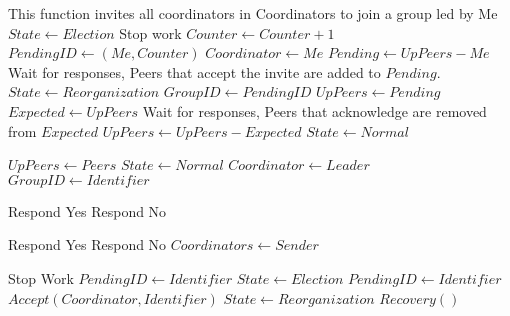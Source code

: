 \begin{flushleft}
\begin{algorithmic}[H]
    \State This function invites all coordinators in Coordinators to join a group led by Me
    \State $State \gets Election$
    \State Stop work
    \State $Counter \gets Counter+1$
    \State $PendingID \gets (Me,Counter)$
    \State $Coordinator \gets Me$
    \State $Pending \gets UpPeers - {Me}$
    \EndFor
    \State Wait for responses, Peers that accept the invite are added to $Pending$.
    \State $State \gets Reorganization$
	\State $GroupID \gets PendingID$
	\State $UpPeers \gets Pending$
    \EndFor
    \State $Expected \gets UpPeers$
    \State Wait for responses, Peers that acknowledge are removed from $Expected$
    \State $UpPeers \gets UpPeers - Expected$
    \State $State \gets Normal$
\EndFunction

\State

        \State $UpPeers \gets Peers$
        \State $State \gets Normal$
		\State $Coordinator \gets Leader$
		\State $GroupID \gets Identifier$
    \EndIf
\EndFunction

\State

        \State Respond Yes
    \Else
        \State Respond No
    \EndIf
\EndFunction

\State

        \State Respond Yes
    \Else
        \State Respond No
        \State $Coordinators \gets Sender$
    \EndIf
\EndFunction

\State

        \Return
    \EndIf
        \Return
    \EndIf
    \State Stop Work
    \State $PendingID \gets Identifier$
    \State $State \gets Election$
    \State $PendingID \gets Identifier$
    \State $Accept(Coordinator,Identifier)$
    \State $State \gets Reorganization$
        \State $Recovery()$
    \EndIf
\EndFunction

\State


\end{algorithmic}
\end{flushleft}

